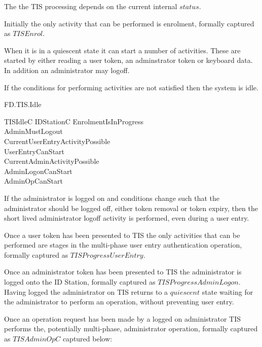 The the TIS processing depends on the current internal $status$. 

Initially the only activity that can be performed is enrolment,
formally captured as
$TISEnrol$.

When it is in a quiescent state it can start a number of activities. These
are started by either reading a user token, an adminstrator token or
keyboard data. In addition an administrator may logoff.

If the conditions for performing activities are not satisfied then the
system is idle.

\begin{traceunit}{FD.TIS.Idle}
\end{traceunit}


\begin{schema}{TISIdleC}
        \Xi IDStationC
\where
        \lnot EnrolmentIsInProgress
\\      \lnot AdminMustLogout
\\      \lnot CurrentUserEntryActivityPossible
\\      \lnot UserEntryCanStart
\\      \lnot CurrentAdminActivityPossible
\\      \lnot AdminLogonCanStart
\\      \lnot AdminOpCanStart        
\end{schema}

If the administrator is logged on and conditions change such that the
administrator should be logged off, either token removal or token
expiry, then the short lived administrator logoff activity is
performed, even during a user entry.

Once a user token has been presented to TIS the only activities
that can be performed are stages in the multi-phase user entry
authentication operation, formally captured as $TISProgressUserEntry$. 

Once an administrator token has been presented to TIS the
administrator is logged onto the ID Station, formally captured as
$TISProgressAdminLogon$. Having logged the administrator on TIS returns to a
$quiescent$ state waiting for the administrator to perform an
operation, without preventing user entry.

Once an operation request has been made by a logged on administrator
TIS performs the, potentially multi-phase, administrator operation,
formally captured as $TISAdminOpC$ captured below:

